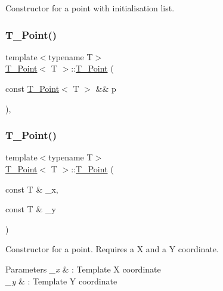 Constructor for a point with initialisation list. 

\mbox{\label{classT__Point_af6c471d7e5547576a6c379930b9d1d35}} 
\subsubsection{\texorpdfstring{T\+\_\+\+Point()}{T\_Point()}\hspace{0.1cm}{\footnotesize\ttfamily [3/4]}}
{\footnotesize\ttfamily template$<$typename T$>$ \\
\hyperlink{classT__Point}{T\+\_\+\+Point}$<$ T $>$\+::\hyperlink{classT__Point}{T\+\_\+\+Point} (\begin{DoxyParamCaption}\item[{const \hyperlink{classT__Point}{T\+\_\+\+Point}$<$ T $>$ \&\&}]{p }\end{DoxyParamCaption})\hspace{0.3cm}{\ttfamily [inline]}, {\ttfamily [noexcept]}}

\mbox{\label{classT__Point_a12f2ef3c5f10e162dcb6385bbfbfae58}} 
\subsubsection{\texorpdfstring{T\+\_\+\+Point()}{T\_Point()}\hspace{0.1cm}{\footnotesize\ttfamily [4/4]}}
{\footnotesize\ttfamily template$<$typename T$>$ \\
\hyperlink{classT__Point}{T\+\_\+\+Point}$<$ T $>$\+::\hyperlink{classT__Point}{T\+\_\+\+Point} (\begin{DoxyParamCaption}\item[{const T \&}]{\+\_\+x,  }\item[{const T \&}]{\+\_\+y }\end{DoxyParamCaption})\hspace{0.3cm}{\ttfamily [inline]}}



Constructor for a point. Requires a X and a Y coordinate. 


\begin{DoxyParams}{Parameters}
{\em \+\_\+x} & \+: Template X coordinate \\
\hline
{\em \+\_\+y} & \+: Template Y coordinate \\
\hline
\end{DoxyParams}


